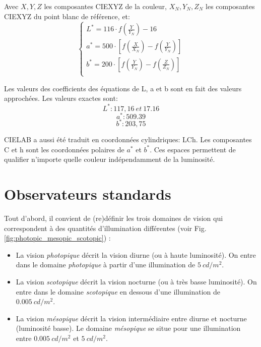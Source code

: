 	\par Avec $X, Y, Z$ les composantes CIEXYZ de la couleur, $X_N, Y_N, Z_N$ les composantes CIEXYZ du point blanc de référence, et:
	\begin{equation}
		\begin{cases}
		L^\ast=116 \cdot f(\frac{Y}{Y_N})-16\\
		a^\ast=500 \cdot \left[f(\frac{X}{X_N})-f(\frac{Y}{Y_N})\right]\\
		b^\ast=200 \cdot \left[f(\frac{Y}{Y_N})-f(\frac{Z}{Z_N})\right]\\
		\end{cases}
	\end{equation}
	
	\par Les valeurs des coefficients des équations de L, a et b sont en fait des valeurs approchées. Les valeurs exactes sont: \[L^\ast: 117,16~et~17.16\] \[a^\ast: 509.39\] \[b^\ast: 203,75\]
	
	\par CIELAB a aussi été traduit en coordonnées cylindriques: LCh. Les composantes C et h sont les coordonnées polaires de $a^\ast$ et $b^\ast$. Ces espaces permettent de qualifier n'importe quelle couleur indépendamment de la luminosité. 
		
	\section{Observateurs standards}
	\par Tout d'abord, il convient de (re)définir les trois domaines de vision qui correspondent à des quantités d'illumination différentes (voir Fig. \ref{fig:photopic_mesopic_scotopic}) \citep{damelincourt_eclairage_2010}:
	\begin{itemize}
		\item La vision \textit{photopique} décrit la vision diurne (ou à haute luminosité). On entre dans le domaine \textit{photopique} à partir d'une illumination de $5~cd/m^2$.
		\item La vision \textit{scotopique} décrit la vision nocturne (ou à très basse luminosité). On entre dans le domaine \textit{scotopique} en dessous d'une illumination de $0.005~cd/m^2$.
		\item La vision \textit{mésopique} décrit la vision intermédiaire entre diurne et nocturne (luminosité basse). Le domaine \textit{mésopique} se situe pour une illumination entre $0.005~cd/m^2$ et $5~cd/m^2$.	
	\end{itemize}
	

